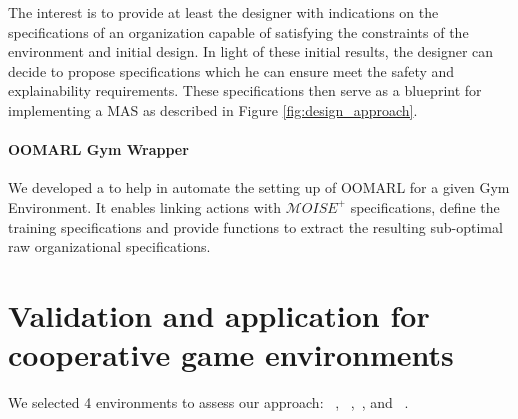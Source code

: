 \documentclass[runningheads]{llncs}
\begin{document}
The interest is to provide at least the designer with indications on the specifications of an organization capable of satisfying the constraints of the environment and initial design. In light of these initial results, the designer can decide to propose specifications which he can ensure meet the safety and explainability requirements. These specifications then serve as a blueprint for implementing a MAS as described in Figure \ref{fig:design_approach}.

\paragraph{\textbf{OOMARL Gym Wrapper}\label{gym-wrapper}} We developed a  to help in automate the setting up of OOMARL for a given Gym Environment. It enables linking actions with $\mathcal{M}OISE^+$ specifications, define the training specifications and provide functions to extract the resulting sub-optimal raw organizational specifications.

\section{Validation and application for cooperative game environments}



We selected 4 environments to assess our approach: ~\cite{Lowe2017},
~\cite{Kurach2020},~\cite{Terry2021}, and ~\cite{Terry2021}.
\end{document}
